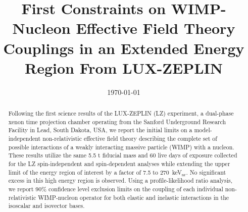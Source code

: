 \documentclass[reprint, showpacs,
preprintnumbers,
amsmath,amssymb,
aps, floatfix,
superscriptaddress,
prd, nofootinbib]{revtex4-1}
\begin{document}
\title{First Constraints on WIMP-Nucleon Effective Field Theory Couplings in an Extended Energy Region From LUX-ZEPLIN}


\date{\today}

\begin{abstract}
Following the first science results of the LUX-ZEPLIN (LZ) experiment, a dual-phase xenon time projection chamber operating from the Sanford Underground Research Facility in Lead, South Dakota, USA, we report the initial limits on a model-independent non-relativistic effective field theory describing the complete set of possible interactions of a weakly interacting massive particle (WIMP) with a nucleon. These results utilize the same 5.5 t fiducial mass and 60 live days of exposure collected for the LZ spin-independent and spin-dependent analyses while extending the upper limit of the energy region of interest by a factor of 7.5 to 270~keV$_\text{nr}$. 
No significant excess in this high energy region is observed. 
Using a profile-likelihood ratio analysis, we report 90\% confidence level exclusion limits on the coupling of each individual non-relativistic WIMP-nucleon operator for both elastic and inelastic interactions in the isoscalar and isovector bases.
\end{abstract}
    
\maketitle

\end{document}
